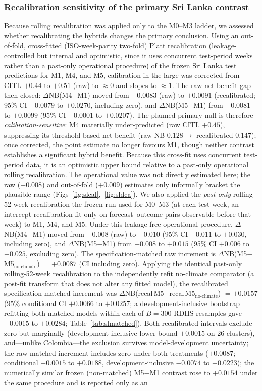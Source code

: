 \documentclass[11pt,a4paper]{article}
\begin{document}
\subsubsection*{Recalibration sensitivity of the primary Sri Lanka contrast}
Because rolling recalibration was applied only to the M0--M3 ladder, we assessed whether recalibrating the hybrids changes the primary conclusion. Using an out-of-fold, cross-fitted (ISO-week-parity two-fold) Platt recalibration (leakage-controlled but internal and optimistic, since it uses concurrent test-period weeks rather than a past-only operational procedure) of the frozen Sri Lanka test predictions for M1, M4, and M5, calibration-in-the-large was corrected from CITL $+0.44$ to $+0.51$ (raw) to $\approx0$ and slopes to $\approx1$. The raw net-benefit gap then closed: $\Delta$NB(M4$-$M1) moved from $-0.0083$ (raw) to $+0.0091$ (recalibrated; 95\% CI $-0.0079$ to $+0.0270$, including zero), and $\Delta$NB(M5$-$M1) from $+0.0081$ to $+0.0099$ (95\% CI $-0.0001$ to $+0.0207$). The planned-primary null is therefore \emph{calibration-sensitive}: M4 materially under-predicted (raw CITL $+0.45$), suppressing its threshold-based net benefit (raw NB $0.128\to$ recalibrated $0.147$); once corrected, the point estimate no longer favours M1, though neither contrast establishes a significant hybrid benefit. Because this cross-fit uses concurrent test-period data, it is an optimistic upper bound relative to a past-only operational rolling recalibration. The operational value was not directly estimated here; the raw ($-0.008$) and out-of-fold ($+0.009$) estimates only informally bracket the plausible range (Figs~\ref{fig:slcal},~\ref{fig:sldca}). We also applied the \emph{past-only} rolling-52-week recalibration the frozen run used for M0--M3 (at each test week, an intercept recalibration fit only on forecast--outcome pairs observable before that week) to M1, M4, and M5. Under this leakage-free operational procedure, $\Delta$NB(M4$-$M1) moved from $-0.008$ (raw) to $+0.010$ (95\% CI $-0.011$ to $+0.030$, including zero), and $\Delta$NB(M5$-$M1) from $+0.008$ to $+0.015$ (95\% CI $+0.006$ to $+0.025$, excluding zero). The specification-matched raw increment is $\Delta$NB(M5$-$M5$_{\text{no-climate}}$) $=+0.0087$ (CI including zero). Applying the identical past-only rolling-52-week recalibration to the independently refit no-climate comparator (a post-fit transform that does not alter any fitted model), the recalibrated specification-matched increment was $\Delta$NB(recal\,M5$-$recal\,M5$_{\text{no-climate}}$) $=+0.0157$ (95\% conditional CI $+0.0066$ to $+0.0257$; a development-inclusive bootstrap refitting both matched models within each of $B=300$ RDHS resamples gave $+0.0015$ to $+0.0284$; Table~\ref{tab:slmatched}). Both recalibrated intervals exclude zero but marginally (development-inclusive lower bound $+0.0015$ on 26 clusters), and---unlike Colombia---the exclusion survives model-development uncertainty; the raw matched increment includes zero under both treatments ($+0.0087$; conditional $-0.0015$ to $+0.0188$, development-inclusive $-0.0074$ to $+0.0223$); the numerically similar frozen (non-matched) M5$-$M1 contrast rose to $+0.0154$ under the same procedure and is reported only as an 
\end{document}
